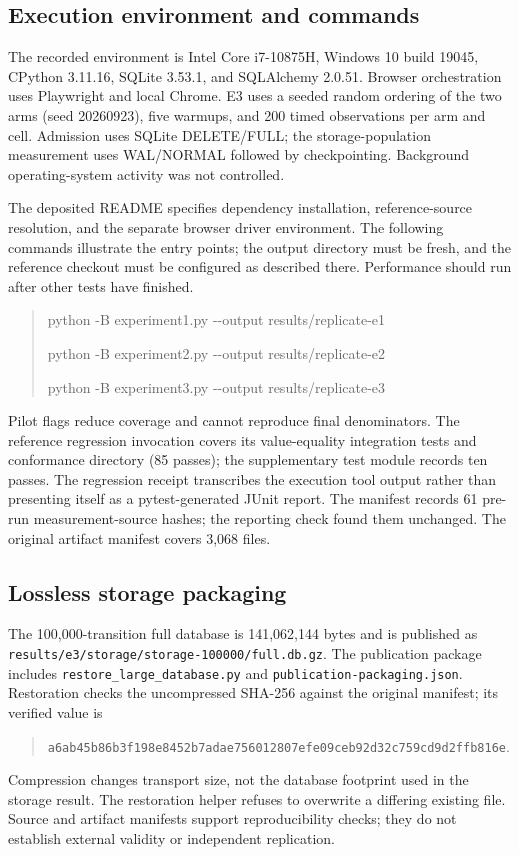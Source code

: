 \documentclass[11pt,a4paper]{article}
\newcommand{\code}[1]{\nolinkurl{#1}}
\begin{document}
\subsection{Execution environment and commands}

The recorded environment is Intel Core i7-10875H, Windows 10 build 19045, CPython 3.11.16, SQLite 3.53.1, and SQLAlchemy 2.0.51. Browser orchestration uses Playwright and local Chrome. E3 uses a seeded random ordering of the two arms (seed 20260923), five warmups, and 200 timed observations per arm and cell. Admission uses SQLite DELETE/FULL; the storage-population measurement uses WAL/NORMAL followed by checkpointing. Background operating-system activity was not controlled.

The deposited README specifies dependency installation, reference-source resolution, and the separate browser driver environment. The following commands illustrate the entry points; the output directory must be fresh, and the reference checkout must be configured as described there. Performance should run after other tests have finished.
\begin{quote}\small\ttfamily
python -B experiment1.py -{}-output results/replicate-e1\par
python -B experiment2.py -{}-output results/replicate-e2\par
python -B experiment3.py -{}-output results/replicate-e3
\end{quote}
Pilot flags reduce coverage and cannot reproduce final denominators. The reference regression invocation covers its value-equality integration tests and conformance directory (85 passes); the supplementary test module records ten passes. The regression receipt transcribes the execution tool output rather than presenting itself as a pytest-generated JUnit report. The manifest records 61 pre-run measurement-source hashes; the reporting check found them unchanged. The original artifact manifest covers 3,068 files.

\subsection{Lossless storage packaging}

The 100,000-transition full database is 141,062,144 bytes and is published as \code{results/e3/storage/storage-100000/full.db.gz}. The publication package includes \code{restore_large_database.py} and \code{publication-packaging.json}. Restoration checks the uncompressed SHA-256 against the original manifest; its verified value is
\begin{quote}\small
\code{a6ab45b86b3f198e8452b7adae756012807efe09ceb92d32c759cd9d2ffb816e}.
\end{quote}
Compression changes transport size, not the database footprint used in the storage result. The restoration helper refuses to overwrite a differing existing file. Source and artifact manifests support reproducibility checks; they do not establish external validity or independent replication.
\end{document}
